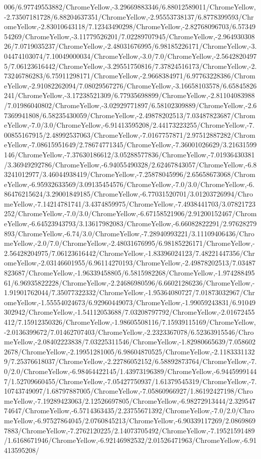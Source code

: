 {\begin{tikzternal}
006/6.97749553882/ChromeYellow,-3.29669883346/6.88012589011/ChromeYellow,-2.73507181728/6.88204637351/ChromeYellow,-2.95553738137/6.8778399593/ChromeYellow,-2.83010643118/7.12343490298/ChromeYellow,-2.82768096703/6.5734954269/ChromeYellow,-3.11779526201/7.02289707945/ChromeYellow,-2.96493030826/7.0719035237/ChromeYellow,-2.48031676995/6.98185226171/ChromeYellow,-3.04474103074/7.10049000034/ChromeYellow,-3.0/7.0/ChromeYellow,-2.56428204975/7.06123616442/ChromeYellow,-3.29551750816/7.37824516173/ChromeYellow,-2.73246786283/6.75911298171/ChromeYellow,-2.9668384971/6.97763228386/ChromeYellow,-2.91082262094/7.08029567276/ChromeYellow,-3.16658103578/6.65845826241/ChromeYellow,-3.17238521309/6.77935698899/ChromeYellow,-2.81104083988/7.01986040802/ChromeYellow,-3.02929771897/6.58102309889/ChromeYellow,-2.67369941808/6.58235430059/ChromeYellow,-2.49878202513/7.03487823687/ChromeYellow,-7.0/3.0/ChromeYellow,-6.91413595208/2.44173223255/ChromeYellow,-7.00855167915/2.48992537063/ChromeYellow,-7.0167757871/2.97512887282/ChromeYellow,-7.08615951649/2.78674771345/ChromeYellow,-7.36001026629/3.21631599146/ChromeYellow,-7.37630186612/3.05288577836/ChromeYellow,-7.01936430381/3.36949292786/ChromeYellow,-6.94055490328/2.62467843057/ChromeYellow,-6.83241012977/3.46044938419/ChromeYellow,-7.25878045996/2.65658673068/ChromeYellow,-6.95932633569/3.09135454576/ChromeYellow,-7.0/3.0/ChromeYellow,-6.86476215624/3.29001849185/ChromeYellow,-6.77031520701/3.01203726994/ChromeYellow,-7.14214781741/3.4374859975/ChromeYellow,-7.4938441703/3.07821723252/ChromeYellow,-7.0/3.0/ChromeYellow,-6.67158521906/2.91200152467/ChromeYellow,-6.64523943793/3.13617982083/ChromeYellow,-6.66082822291/2.97628279893/ChromeYellow,-6.74/3.0/ChromeYellow,-7.28940993221/3.11109406436/ChromeYellow,-2.0/7.0/ChromeYellow,-2.48031676995/6.98185226171/ChromeYellow,-2.56428204975/7.06123616442/ChromeYellow,-1.83396024123/7.48221447356/ChromeYellow,-2.03146601955/6.96114270193/ChromeYellow,-2.49878202513/7.03487823687/ChromeYellow,-1.96339458805/6.5815982268/ChromeYellow,-1.97428849561/6.96935822228/ChromeYellow,-2.24686980596/6.66021286236/ChromeYellow,-1.91901762044/7.35077322332/ChromeYellow,-1.95364080727/7.01873032967/ChromeYellow,-1.55554024673/6.92960449073/ChromeYellow,-1.99059243831/6.91049302942/ChromeYellow,-1.54112053688/7.03208797792/ChromeYellow,-2.01672455412/7.15912350326/ChromeYellow,-1.98605508116/7.15939115169/ChromeYellow,-2.0136399672/7.01462707403/ChromeYellow,-2.2323367078/6.52363915546/ChromeYellow,-2.08402223838/7.03225311546/ChromeYellow,-1.82980665639/7.0586022678/ChromeYellow,-2.19951281005/6.98604870525/ChromeYellow,-2.11833311329/7.25376618037/ChromeYellow,-2.22786052152/6.58892873764/ChromeYellow,-7.0/2.0/ChromeYellow,-6.98464422145/1.43973196389/ChromeYellow,-6.94459991447/1.52709660455/ChromeYellow,-7.05427750937/1.61379545319/ChromeYellow,-7.10743749097/1.68797887005/ChromeYellow,-7.05860966927/1.86192427198/ChromeYellow,-7.19289423063/2.12526697805/ChromeYellow,-6.98272913444/2.32954774647/ChromeYellow,-6.5714363435/2.23755671392/ChromeYellow,-7.0/2.0/ChromeYellow,-6.97527864045/2.0760845213/ChromeYellow,-6.90339117269/2.08698697883/ChromeYellow,-7.2762120225/2.14073705492/ChromeYellow,-7.19521591489/1.6168671946/ChromeYellow,-6.92146982532/2.01526471963/ChromeYellow,-6.91413595208/
\end{tikzternal}}
